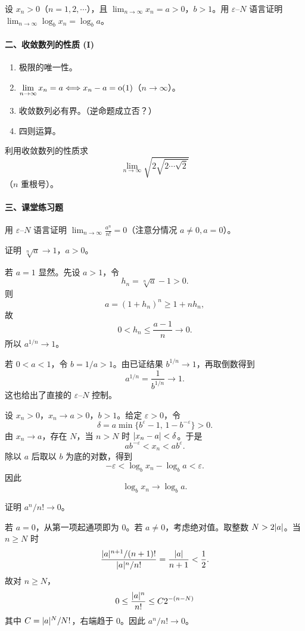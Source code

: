 \begin{xexample}[1.2]
设 $x_n>0$（$n=1,2,\cdots$），且 $\displaystyle\lim_{n\to\infty}x_n=a>0$，$b>1$。用 $\varepsilon$--$N$ 语言证明 $\displaystyle\lim_{n\to\infty}\log_bx_n=\log_ba$。
\end{xexample}

\paragraph{二、收敛数列的性质 (I)}

\begin{enumerate}[label=\arabic*.]
  \item 极限的唯一性。
  \item $\displaystyle\lim_{n\to\infty}x_n=a\Longleftrightarrow x_n-a=\mathrm{o}(1)$（$n\to\infty$）。
  \item 收敛数列必有界。（逆命题成立否？）
  \item 四则运算。
\end{enumerate}

\begin{xexample}[2.1]
利用收敛数列的性质求
\[
  \lim_{n\to\infty}\sqrt{2\sqrt{2\cdots\sqrt2}}
\]
（$n$ 重根号）。
\end{xexample}

\paragraph{三、课堂练习题}

\begin{xexercise}[1]
用 $\varepsilon$--$N$ 语言证明 $\displaystyle\lim_{n\to\infty}\frac{a^n}{n!}=0$（注意分情况 $a\ne0,a=0$）。
\end{xexercise}
\begin{xsolution}
证明 $\sqrt[n]a\to1$，$a>0$。

若 $a=1$ 显然。先设 $a>1$，令
\[
  h_n=\sqrt[n]a-1>0.
\]
则
\[
  a=(1+h_n)^n\ge1+nh_n,
\]
故
\[
  0<h_n\le\frac{a-1}{n}\to0.
\]
所以 $a^{1/n}\to1$。

若 $0<a<1$，令 $b=1/a>1$。由已证结果 $b^{1/n}\to1$，再取倒数得到
\[
  a^{1/n}=\frac1{b^{1/n}}\to1.
\]
这也给出了直接的 $\varepsilon$--$N$ 控制。

设 $x_n>0$，$x_n\to a>0$，$b>1$。给定 $\varepsilon>0$，令
\[
  \delta=a\min\{b^\varepsilon-1,\,1-b^{-\varepsilon}\}>0.
\]
由 $x_n\to a$，存在 $N$，当 $n>N$ 时 $\lvert x_n-a\rvert<\delta$。于是
\[
  ab^{-\varepsilon}<x_n<ab^\varepsilon.
\]
除以 $a$ 后取以 $b$ 为底的对数，得到
\[
  -\varepsilon<\log_bx_n-\log_ba<\varepsilon.
\]
因此
\[
  \boxed{\log_bx_n\to\log_ba}.
\]

证明 $a^n/n!\to0$。

若 $a=0$，从第一项起通项即为 $0$。若 $a\ne0$，考虑绝对值。取整数 $N>2\lvert a\rvert$。当 $n\ge N$ 时
\[
  \frac{\lvert a\rvert^{n+1}/(n+1)!}{\lvert a\rvert^n/n!}
  =\frac{\lvert a\rvert}{n+1}<\frac12.
\]
故对 $n\ge N$，
\[
  0\le\frac{\lvert a\rvert^n}{n!}
  \le C2^{-(n-N)}
\]
其中 $C=\lvert a\rvert^N/N!$，右端趋于 $0$。因此 $a^n/n!\to0$。
\end{xsolution}


